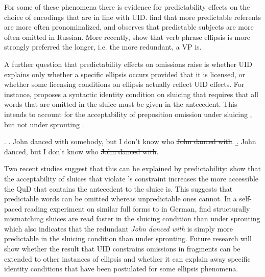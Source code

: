 For some of these phenomena there is evidence for predictability effects on the choice of encodings  that are in line with UID. \citet{tily.piantadosi2009} find that more predictable referents are more often pronominalized, and \citet{kravtchenko2014} observes that predictable subjects are more often omitted in Russian. More recently, \citet{schafer.etalunderreview} show that verb phrase ellipsis is more strongly preferred the longer, i.e. the more redundant, a VP is.

A further question that predictability effects on omissions raise is whether UID explains only whether a specific ellipsis occurs provided that it is licensed, or whether some licensing conditions on ellipsis actually reflect UID effects. For instance, \citet{chung2006} proposes a syntactic identity condition on sluicing that requires that all words that are omitted in the sluice must be given in the antecedent. This intends to account for the acceptability of preposition omission under sluicing \Next[a], but not under sprouting \Next[b].

\ex. \a. John danced with somebody, but I don't know who \sout{John danced with}.
     \b. John danced, but I don't know who \sout{John danced with}.

Two recent studies suggest that this can be explained by predictability: \citet{poppels.kehler2019a} show that the acceptability of sluices that violate \citeauthor{chung2006}'s constraint increases the more accessible the QuD that contains the antecedent to the sluice is. This suggests that predictable words can be omitted whereas unpredictable ones cannot. In a self-paced reading experiment on similar full forms to \Last in German, \citet{lemke.etalaccepted} find structurally mismatching sluices are read faster in the sluicing condition than under sprouting which also indicates that the redundant \textit{John danced with} is simply more predictable in the sluicing condition than under sprouting. Future research will show whether the result that UID constrains omissions in fragments can be extended to other instances of ellipsis and whether it can explain away specific identity conditions that have been postulated for some ellipsis phenomena.
